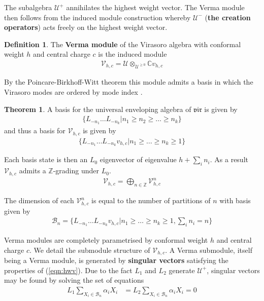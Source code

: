 \documentclass[a4paper,reqno,12pt]{report}
\theoremstyle{definition}
\newtheorem{defn}{Definition}[section]
\newtheorem{thm}{Theorem}[section]
\newcommand{\Z}{\mathbb{Z}}
\newcommand{\C}{\mathbb{C}}
\numberwithin{equation}{section}
\renewcommand{\ge}{\geqslant}
\theoremstyle{plain}
\begin{document}
The subalgebra $\mathcal{U}^+$ annihilates the highest weight vector. The Verma module then follows from the induced module construction whereby $\mathcal{U}^-$ ({\bf the creation operators}) acts freely on the highest weight vector.

\begin{defn}
The {\bf Verma module} of the Virasoro algebra with conformal weight $h$ and central charge $c$ is the induced module
\begin{align*}
\mathcal{V}_{h,c} = \mathcal{U}\otimes_{\mathcal{U}^{\ge 0}} \C v_{h,c}
\end{align*}
\end{defn}

By the Poincare-Birkhoff-Witt theorem this module admits a basis in which the Virasoro modes are ordered by mode index \cite{BirRep37}.

\begin{thm}
A basis for the universal enveloping algebra of $\mathfrak{vir}$ is given by
\begin{align*}
\{L_{-n_1}\dots L_{-n_k}|n_1\ge n_2 \ge\dots \ge n_k\}
\end{align*}
and thus a basis for $\mathcal{V}_{h,c}$ is given by
\begin{align*}
\{L_{-n_1}\dots L_{-n_k}v_{h,c}|n_1\ge \dots \ge n_k \ge 1\}
\end{align*}
\end{thm}

Each basis state is then an $L_0$ eigenvector of eigenvalue $h + \sum_i n_i$. As a result $\mathcal{V}_{h,c}$ admits a $\Z$-grading under $L_0$. 
\begin{align*}
\mathcal{V}_{h,c} = \bigoplus_{n\in \Z} \mathcal{V}_{h,c}^n
\end{align*}

The dimension of each $\mathcal{V}_{h,c}^n$ is equal to the number of partitions of $n$ with basis given by  
\begin{align*}
\mathcal{B}_n = \{L_{-n_1}\dots L_{-n_k}v_{h,c}|n_1\ge \dots \ge n_k \ge 1, \sum_i n_i = n\}
\end{align*}

Verma modules are completely parametrised by conformal weight $h$ and central charge $c$. We detail the submodule structure of $\mathcal{V}_{h,c}$. A Verma submodule, itself being a Verma module, is generated by {\bf singular vectors} \cite{FeiFuch90} satisfying the properties of (\ref{eqn:hwv}). Due to the fact $L_1$ and $L_2$ generate $\mathcal{U}^+$, singular vectors may be found by solving the set of equations
\begin{align*}
L_{1}\sum_{X_i\in \mathcal{B}_n} \alpha_i X_i  &= L_{2}\sum_{X_i\in \mathcal{B}_n} \alpha_i X_i  = 0
\end{align*}
\end{document}
